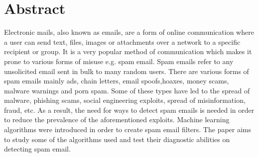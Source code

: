 \section{Abstract}
Electronic mails, also known as emails, are a form of online communication where a user can send text, files, images or attachments over a network to a specific recipient or group. It is a very popular method of communication which makes it prone to various forms of misuse e.g. spam email. Spam emails refer to any unsolicited email sent in bulk to many random users. There are various forms of spam emails mainly ads, chain letters, email spoofs,hoaxes, money scams, malware warnings and porn spam. Some of these types have led to the spread of malware, phishing scams, social engineering exploits, spread of misinformation, fraud, etc. As a result, the need for ways to detect spam emails is needed in order to reduce the prevalence of the aforementioned exploits. Machine learning algorithms were introduced in order to create spam email filters. The paper aims to study some of the algorithms used and test their diagnostic abilities on detecting spam email.